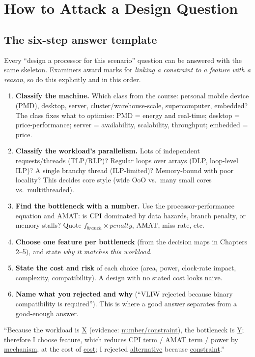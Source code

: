 \chapter{How to Attack a Design Question}\label{ch:method}

\section{The six-step answer template}
Every ``design a processor for this scenario'' question can be answered with the same skeleton. Examiners award marks for \emph{linking a constraint to a feature with a reason}, so do this explicitly and in this order.

\begin{enumerate}[leftmargin=*]
\item \textbf{Classify the machine.} Which class from the course: personal mobile device (PMD), desktop, server, cluster/warehouse-scale, supercomputer, embedded? The class fixes what to optimise: PMD = energy and real-time; desktop = price-performance; server = availability, scalability, throughput; embedded = price.
\item \textbf{Classify the workload's parallelism.} Lots of independent requests/threads (TLP/RLP)? Regular loops over arrays (DLP, loop-level ILP)? A single branchy thread (ILP-limited)? Memory-bound with poor locality? This decides core style (wide OoO vs.\ many small cores vs.\ multithreaded).
\item \textbf{Find the bottleneck with a number.} Use the processor-performance equation and AMAT: is $\mathrm{CPI}$ dominated by data hazards, branch penalty, or memory stalls? Quote $f_{branch}\times penalty$, $\mathrm{AMAT}$, miss rate, etc.
\item \textbf{Choose one feature per bottleneck} (from the decision maps in Chapters 2--5), and state \emph{why it matches this workload}.
\item \textbf{State the cost and risk} of each choice (area, power, clock-rate impact, complexity, compatibility). A design with no stated cost looks naive.
\item \textbf{Name what you rejected and why} (``VLIW rejected because binary compatibility is required''). This is where a good answer separates from a good-enough answer.
\end{enumerate}

\begin{key}
``Because the workload is \underline{X} (evidence: \underline{number/constraint}), the bottleneck is \underline{Y}; therefore I choose \underline{feature}, which reduces \underline{CPI term / AMAT term / power} by \underline{mechanism}, at the cost of \underline{cost}; I rejected \underline{alternative} because \underline{constraint}.''
\end{key}

